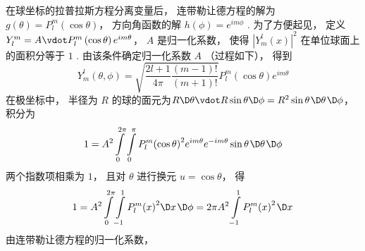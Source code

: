 在球坐标的拉普拉斯方程分离变量后， 连带勒让德方程的解为 $g\left( \theta  \right) = P_l^m\left( {\cos \theta } \right)$， 方向角函数的解 $h\left( \phi  \right) = {e^{im\phi }}$ . 为了方便起见， 定义 $Y_l^m = A \vdot P_l^m\left( {\cos \theta } \right){e^{im\theta }}$， $A$ 是归一化系数， 使得 ${\left| {Y_m^l\left( x \right)} \right|^2}$ 在单位球面上的面积分等于 $1$ .  由该条件确定归一化系数 $A$ （过程如下）， 得到
\begin{equation}
  Y_m^l\left( {\theta ,\phi } \right) = \sqrt {\frac{{2l + 1}}{{4\pi }}\frac{{(m - 1)!}}{{(m + 1)!}}} P_l^m\left( {\cos \theta } \right){e^{im\theta }}
\end{equation}
在极坐标中， 半径为 $R$ 的球的面元为$R \D \theta  \vdot R\sin \theta \D \phi  = {R^2}\sin \theta {\kern 1pt} \D \theta {\kern 1pt} \D \phi $，  积分为
\begin{equation}
  1 = {A^2}\int\limits_0^{2\pi } {\int\limits_0^\pi  {P_l^m{{\left( {\cos \theta } \right)}^2}{e^{im\theta }}{e^{ - im\theta }}\sin \theta {\kern 1pt} \D \theta {\kern 1pt} \D \phi } } 
\end{equation}
两个指数项相乘为 $1$，  且对 $\theta $ 进行换元 $u = \cos \theta $， 得
\begin{equation}
  1 = {A^2}\int\limits_0^{2\pi } {\int\limits_{ - 1}^1 {P_l^m{{\left( x \right)}^2}\D x{\kern 1pt} \D \phi } }  = 2\pi {A^2}\int\limits_{ - 1}^1 {P_l^m{{\left( x \right)}^2}{\kern 1pt} \D x{\kern 1pt} } 
\end{equation}
由连带勒让德方程的归一化系数， %

